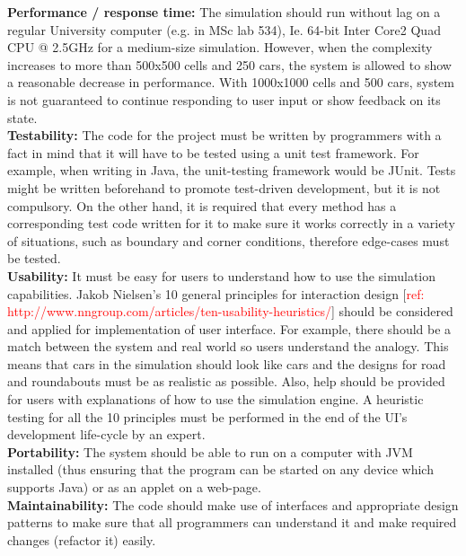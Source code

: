 \documentclass{article}
\begin{document}
	\noindent
	\textbf{Performance / response time:} The simulation should run without lag on a regular University computer (e.g. in MSc lab 534), Ie. 64-bit Inter Core2 Quad CPU @ 2.5GHz for a medium-size simulation. 
	However, when the complexity increases to more than 500x500 cells and 250 cars, the system is allowed to show a reasonable decrease in performance. 
	With 1000x1000 cells and 500 cars, system is not guaranteed to continue responding to user input or show feedback on its state.\\
	
	\noindent
	\textbf{Testability:} The code for the project must be written by programmers with a fact in mind that it will have to be tested using a unit test framework. For example, when writing in Java, the unit-testing framework would be JUnit. 
	Tests might be written beforehand to promote test-driven development, but it is not compulsory. 
	On the other hand, it is required that every method has a corresponding test code written for it to make sure it works correctly in a variety of situations, such as boundary and corner conditions, therefore edge-cases must be tested.\\
	
	\noindent 
	\textbf{Usability:} It must be easy for users to understand how to use the simulation capabilities. Jakob Nielsen's 10 general principles for interaction design [\textcolor{red}{ref: http://www.nngroup.com/articles/ten-usability-heuristics/}] should be considered and applied for implementation of user interface. For example, there should be a match between the system and real world so users understand the analogy. 
	This means that cars in the simulation should look like cars and the designs for road and roundabouts must be as realistic as possible. 
	Also, help should be provided for users with explanations of how to use the simulation engine. 
	A heuristic testing for all the 10 principles must be performed in the end of the UI’s development life-cycle by an expert. \\
	
	\noindent 
	\textbf{Portability:} The system should be able to run on a computer with JVM installed (thus ensuring that the program can be started on any device which supports Java) or as an applet on a web-page. \\
	
	\noindent
	\textbf{Maintainability:} The code should make use of interfaces and appropriate design patterns to make sure that all programmers can understand it and make required changes (refactor it) easily.\\
	
\end{document}
